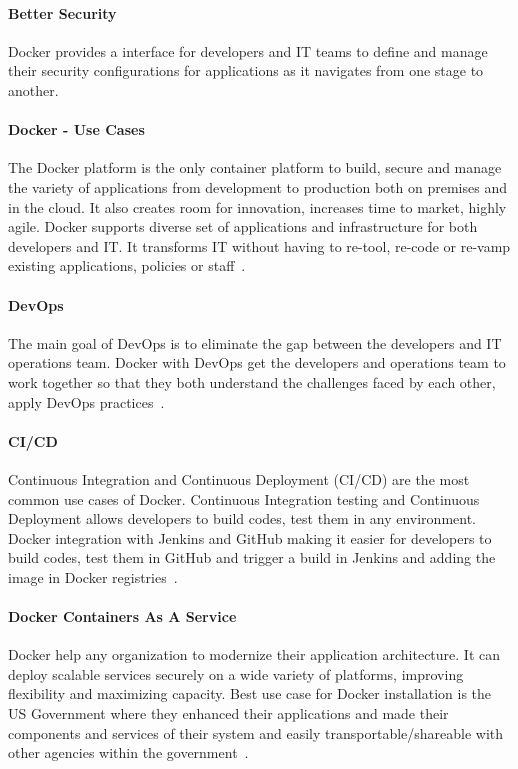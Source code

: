 	\paragraph{Better Security}
	Docker provides a interface for developers and IT teams to define
  and manage their security configurations for applications as it
  navigates from one stage to another.
	
	\paragraph{Docker - Use Cases}
	The Docker platform is the only container platform to build, secure
  and manage the variety of applications from development to
  production both on premises and in the cloud. It also creates room
  for innovation, increases time to market, highly agile.  Docker
  supports diverse set of applications and infrastructure for both
  developers and IT. It transforms IT without having to re-tool,
  re-code or re-vamp existing applications, policies or
  staff~\cite{hackernoon}.
  
	\paragraph{DevOps}
	The main goal of DevOps is to eliminate the gap between the
  developers and IT operations team. Docker with DevOps get the
  developers and operations team to work together so that they both
  understand the challenges faced by each other, apply DevOps
  practices~\cite{hackernoon}.
  
	\paragraph{CI/CD}
	Continuous Integration and Continuous Deployment (CI/CD) are the
  most common use cases of Docker. Continuous Integration testing and
  Continuous Deployment allows developers to build codes, test them in
  any environment. Docker integration with Jenkins and GitHub making
  it easier for developers to build codes, test them in GitHub and
  trigger a build in Jenkins and adding the image in Docker
  registries~\cite{hackernoon}.
  
	\paragraph{Docker Containers As A Service}
	Docker help any organization to modernize their application
  architecture. It can deploy scalable services securely on a wide
  variety of platforms, improving flexibility and maximizing capacity.
  Best use case for Docker installation is the US Government where
  they enhanced their applications and made their components and
  services of their system and easily transportable/shareable with
  other agencies within the government~\cite{hackernoon}.
	
